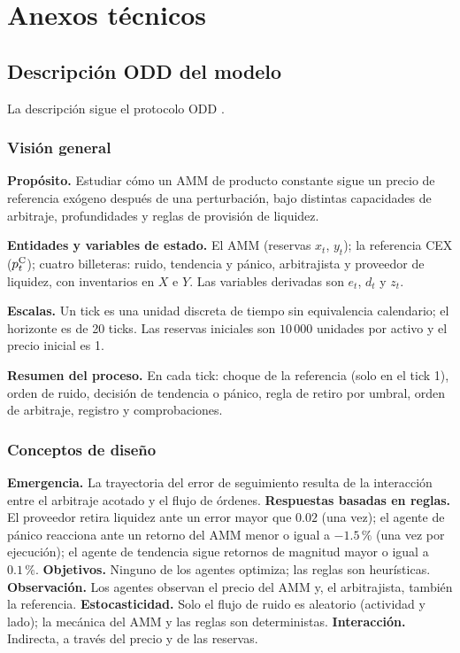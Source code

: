 \chapter{Anexos técnicos}
\label{cap:anexos}

\section{Descripción ODD del modelo}
\label{sec:odd}

La descripción sigue el protocolo ODD \cite{grimm2020odd}.

\subsection*{Visión general}

\textbf{Propósito.} Estudiar cómo un AMM de producto constante sigue un precio de referencia exógeno después de una perturbación, bajo distintas capacidades de arbitraje, profundidades y reglas de provisión de liquidez.

\textbf{Entidades y variables de estado.} El AMM (reservas $x_t$, $y_t$); la referencia CEX ($p^{\mathrm{C}}_t$); cuatro billeteras: ruido, tendencia y pánico, arbitrajista y proveedor de liquidez, con inventarios en $X$ e $Y$. Las variables derivadas son $e_t$, $d_t$ y $z_t$.

\textbf{Escalas.} Un tick es una unidad discreta de tiempo sin equivalencia calendario; el horizonte es de 20 ticks. Las reservas iniciales son $10\,000$ unidades por activo y el precio inicial es 1.

\textbf{Resumen del proceso.} En cada tick: choque de la referencia (solo en el tick 1), orden de ruido, decisión de tendencia o pánico, regla de retiro por umbral, orden de arbitraje, registro y comprobaciones.

\subsection*{Conceptos de diseño}

\textbf{Emergencia.} La trayectoria del error de seguimiento resulta de la interacción entre el arbitraje acotado y el flujo de órdenes. \textbf{Respuestas basadas en reglas.} El proveedor retira liquidez ante un error mayor que $0.02$ (una vez); el agente de pánico reacciona ante un retorno del AMM menor o igual a $-1.5\,\%$ (una vez por ejecución); el agente de tendencia sigue retornos de magnitud mayor o igual a $0.1\,\%$. \textbf{Objetivos.} Ninguno de los agentes optimiza; las reglas son heurísticas. \textbf{Observación.} Los agentes observan el precio del AMM y, el arbitrajista, también la referencia. \textbf{Estocasticidad.} Solo el flujo de ruido es aleatorio (actividad y lado); la mecánica del AMM y las reglas son deterministas. \textbf{Interacción.} Indirecta, a través del precio y de las reservas.

